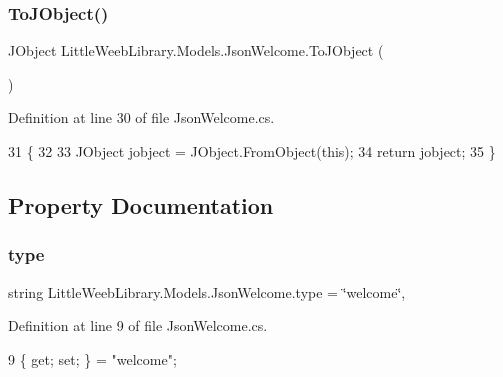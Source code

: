 \subsubsection{\texorpdfstring{To\+J\+Object()}{ToJObject()}}
{\footnotesize\ttfamily J\+Object Little\+Weeb\+Library.\+Models.\+Json\+Welcome.\+To\+J\+Object (\begin{DoxyParamCaption}{ }\end{DoxyParamCaption})}



Definition at line 30 of file Json\+Welcome.\+cs.


\begin{DoxyCode}
31         \{
32 
33             JObject jobject = JObject.FromObject(\textcolor{keyword}{this});
34             \textcolor{keywordflow}{return} jobject;
35         \}
\end{DoxyCode}


\subsection{Property Documentation}
\mbox{\label{class_little_weeb_library_1_1_models_1_1_json_welcome_aa19331f4dd36ccf8f06ee8f72116643b}} 
\subsubsection{\texorpdfstring{type}{type}}
{\footnotesize\ttfamily string Little\+Weeb\+Library.\+Models.\+Json\+Welcome.\+type = \char`\"{}welcome\char`\"{}\hspace{0.3cm}{\ttfamily [get]}, {\ttfamily [set]}}



Definition at line 9 of file Json\+Welcome.\+cs.


\begin{DoxyCode}
9 \{ \textcolor{keyword}{get}; \textcolor{keyword}{set}; \} = \textcolor{stringliteral}{"welcome"};
\end{DoxyCode}
\mbox{\label{class_little_weeb_library_1_1_models_1_1_json_welcome_a4ef0527a64420ba1f47304a0a3f02627}} 
